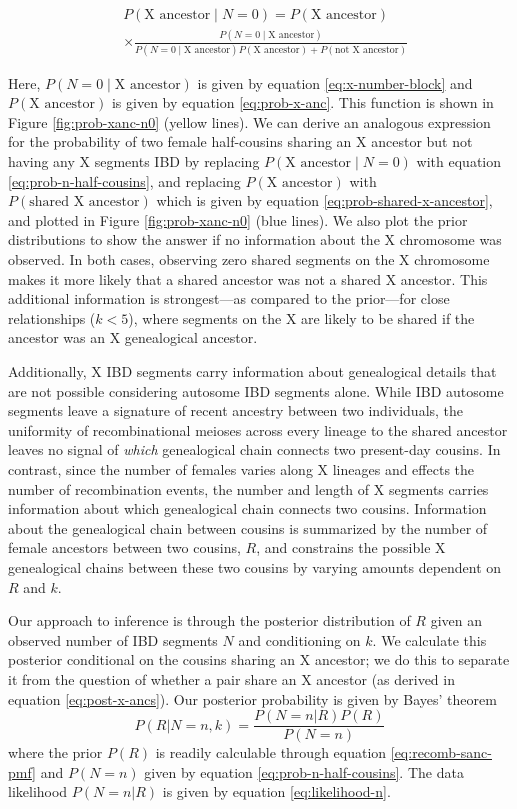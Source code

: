 \documentclass[9pt,twocolumn,twoside]{gsajnl}
\begin{document}
\begin{align}
  \label{eq:post-x-ancs}
  & P(\text{X ancestor}  \;|\; N = 0) = P(\text{X ancestor}) \\ \nonumber
  & \times \frac{P(N = 0 \;|\; \text{X ancestor})}{P(N = 0 \;|\; \text{X ancestor})P(\text{X ancestor}) + P(\text{not X ancestor})}
\end{align}

Here, $P(N = 0  \;|\; \text{X ancestor})$ is given by equation
\eqref{eq:x-number-block} and $P(\text{X ancestor})$ is given by equation
\eqref{eq:prob-x-anc}. This function is shown in Figure \ref{fig:prob-xanc-n0}
(yellow lines). We can derive an analogous expression for the probability of
two female half-cousins sharing an X ancestor but not having any X segments IBD
by replacing $P(\text{X ancestor} \;|\; N = 0)$ with equation
\eqref{eq:prob-n-half-cousins}, and replacing $P(\text{X ancestor})$ with
$P(\text{shared X ancestor})$ which is given by equation
\eqref{eq:prob-shared-x-ancestor}, and plotted in Figure \ref{fig:prob-xanc-n0}
(blue lines). We also plot the prior distributions to show the answer if no
information about the X chromosome was observed. In both cases, observing zero
shared segments on the X chromosome makes it more likely that a shared ancestor
was not a shared X ancestor. This additional information is strongest---as
compared to the prior---for close relationships ($k<5$), where segments on the
X are likely to be shared if the ancestor was an X genealogical ancestor. 

Additionally, X IBD segments carry information about genealogical details that
are not possible considering autosome IBD segments alone. While IBD autosome
segments leave a signature of recent ancestry between two individuals, the
uniformity of recombinational meioses across every lineage to the shared
ancestor leaves no signal of \emph{which} genealogical chain connects two
present-day cousins. In contrast, since the number of females varies along X
lineages and effects the number of recombination events, the number and length
of X segments carries information about which genealogical chain connects two
cousins. Information about the genealogical chain between cousins is summarized
by the number of female ancestors between two cousins, $R$, and constrains the
possible X genealogical chains between these two cousins by varying amounts
dependent on $R$ and $k$.

Our approach to inference is through the posterior distribution of $R$ given an
observed number of IBD segments $N$ and conditioning on $k$. We calculate this
posterior conditional on the cousins sharing an X ancestor; we do this to
separate it from the question of whether a pair share an X ancestor (as derived
in equation \eqref{eq:post-x-ancs}). Our posterior probability is given by
Bayes' theorem
%
\begin{equation}
  P(R | N = n, k) = \frac{P(N = n | R) P(R)}{P(N=n)}
\end{equation}
%
where the prior $P(R)$ is readily calculable through equation
\eqref{eq:recomb-sanc-pmf} and $P(N=n)$ given by equation
\eqref{eq:prob-n-half-cousins}. The data likelihood $P(N = n | R)$ is given by
equation \eqref{eq:likelihood-n}.
\end{document}
